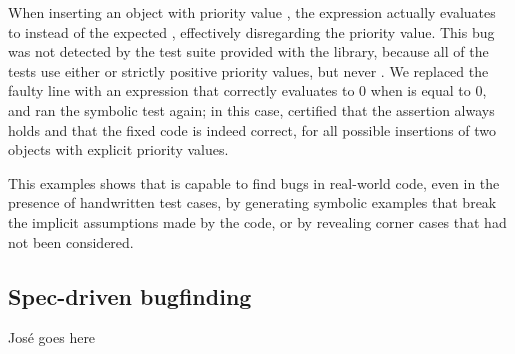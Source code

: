 When inserting an object with priority value , the  expression actually evaluates to  instead of the expected , effectively disregarding the priority value.
This bug was not detected by the test suite provided with the library, because all of the tests use either  or strictly positive priority values, but never .
We replaced the faulty line with an expression that correctly evaluates to 0 when  is equal to 0, and ran the symbolic test again; in this case, \cosette certified that the assertion always holds and that the fixed code is indeed correct, for all possible insertions of two objects with explicit priority values.

This examples shows that \cosette is capable to find bugs in real-world code, even in the presence of handwritten test cases, by generating symbolic examples that break the implicit assumptions made by the code, or by revealing corner cases that had not been considered.


\subsection{Spec-driven bugfinding}

José goes here